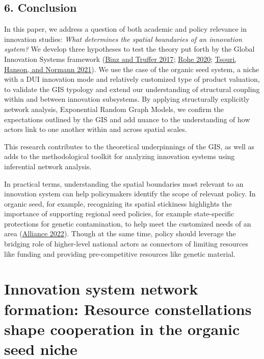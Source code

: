 \documentclass[twoside,12pt,final]{ucthesis-CA2012}
\begin{document}
\begin{ucmainmatter}
\hypertarget{conclusion}{%
\section{6. Conclusion}\label{conclusion}}

In this paper, we address a question of both academic and policy
relevance in innovation studies: \emph{What determines the spatial boundaries
of an innovation system?} We develop three hypotheses to test the theory
put forth by the Global Innovation Systems framework
(\protect\hyperlink{ref-Binz_Truffer_2017}{Binz and Truffer 2017}; \protect\hyperlink{ref-Rohe_2020}{Rohe 2020}; \protect\hyperlink{ref-Tsouri_Hanson_Normann_2021}{Tsouri, Hanson, and Normann 2021}).
We use the case of the organic seed system, a niche with a DUI
innovation mode and relatively customized type of product valuation, to
validate the GIS typology and extend our understanding of structural
coupling within and between innovation subsystems. By applying
structurally explicitly network analysis, Exponential Random Graph
Models, we confirm the expectations outlined by the GIS and add nuance
to the understanding of how actors link to one another within and across
spatial scales.

This research contributes to the theoretical underpinnings of the GIS,
as well as adds to the methodological toolkit for analyzing innovation
systems using inferential network analysis.

In practical terms, understanding the spatial boundaries most relevant
to an innovation system can help policymakers identify the scope of
relevant policy. In organic seed, for example, recognizing its spatial
stickiness highlights the importance of supporting regional seed
policies, for example state-specific protections for genetic
contamination, to help meet the customized needs of an area (\protect\hyperlink{ref-Organic_Seed_Alliance_2022}{Alliance 2022}). Though
at the same time, policy should leverage the bridging role of
higher-level national actors as connectors of limiting resources like
funding and providing pre-competitive resources like genetic material.

\hypertarget{innovation-system-network-formation-resource-constellations-shape-cooperation-in-the-organic-seed-niche}{%
\chapter{Innovation system network formation: Resource constellations shape cooperation in the organic seed niche}\label{innovation-system-network-formation-resource-constellations-shape-cooperation-in-the-organic-seed-niche}}


\end{ucmainmatter}
\end{document}
